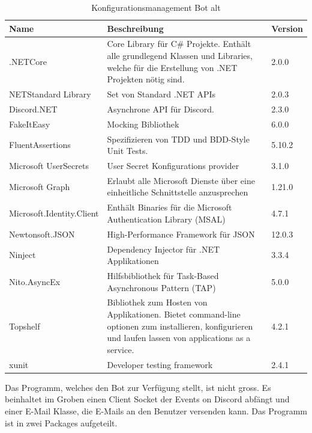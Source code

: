 \documentclass[a4paper, table]{article}
\begin{document}
\begin{table}[h]
    \centering
    \begin{tabular}{|l|p{20em}|l|}
        \hline
        \rowcolor[gray]{.9} Name & Beschreibung & Version \\
        \hline
        .NETCore & Core Library für C\# Projekte.
        Enthält alle grundlegend Klassen und Libraries, welche für die Erstellung von .NET Projekten nötig sind. & 2.0.0 \\
        \hline
        NETStandard Library & Set von Standard .NET APIs & 2.0.3 \\
        \hline
        Discord.NET & Asynchrone API für Discord. & 2.3.0 \\
        \hline
        FakeItEasy & Mocking Bibliothek & 6.0.0 \\
        \hline
        FluentAssertions & Spezifizieren von TDD und BDD-Style Unit Tests. & 5.10.2 \\
        \hline
        Microsoft UserSecrets & User Secret Konfigurations provider & 3.1.0 \\
        \hline
        Microsoft Graph & Erlaubt alle Microsoft Dienste über eine einheitliche Schnittstelle anzusprechen & 1.21.0 \\
        \hline
        Microsoft.Identity.Client & Enthält Binaries für die Microsoft Authentication Library (MSAL) & 4.7.1 \\
        \hline
        Newtonsoft.JSON & High-Performance Framework für JSON & 12.0.3 \\
        \hline
        Ninject & Dependency Injector für .NET Applikationen & 3.3.4 \\
        \hline
        Nito.AsyncEx & Hilfsbibliothek für Task-Based Asynchronous Pattern (TAP) & 5.0.0 \\
        \hline
        Topshelf & Bibliothek zum Hosten von Applikationen. 
        Bietet command-line optionen zum installieren, konfigurieren und laufen lassen von applications as a service. & 4.2.1 \\
        \hline
        xunit & Developer testing framework & 2.4.1 \\
        \hline
    \end{tabular}
    \caption{Konfigurationsmanagement Bot alt}
    \label{tab: Konfigurationsmanagement-Bot-alt}
\end{table}


Das Programm, welches den Bot zur Verfügung stellt, ist nicht gross. Es beinhaltet im Groben einen Client Socket der
Events on Discord abfängt und einer E-Mail Klasse, die E-Mails an den Benutzer versenden kann.
Das Programm ist in zwei Packages aufgeteilt.
\end{document}

